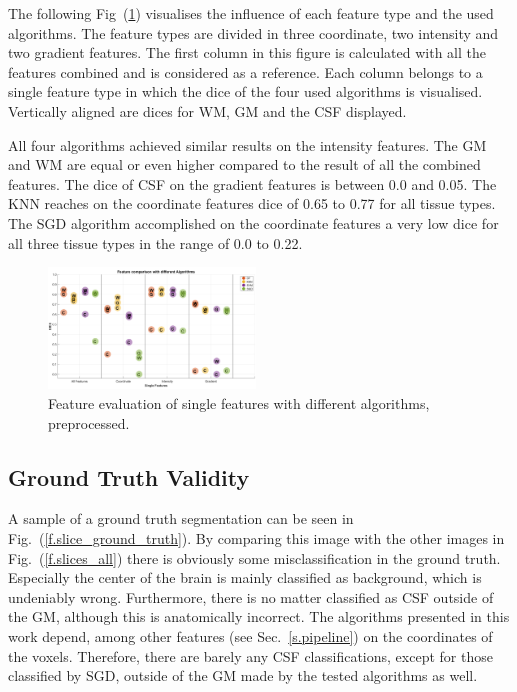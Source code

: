 \documentclass[journal]{IEEEtran}
\begin{document}
The following Fig~(\ref{FeatEval}) visualises the influence of each feature type and the used algorithms. The feature types are divided in three coordinate, two intensity and two gradient features. The first column in this figure is calculated with all the features combined and is considered as a reference. Each column belongs to a single feature type in which the dice of the four used algorithms is visualised. Vertically aligned are dices for WM, GM and the CSF displayed.

All four algorithms achieved similar results on the intensity features. The GM and WM are equal or even higher compared to the result of all the combined features. The dice of CSF on the gradient features is between 0.0 and 0.05. The KNN reaches on the coordinate features dice of 0.65 to 0.77 for all tissue types. The SGD algorithm accomplished on the coordinate features a very low dice for all three tissue types in the range of 0.0 to 0.22.
\begin{figure}[h]
	\centering
	\includegraphics[width=0.49\textwidth]{images/FeatureEvaluation}
	\caption{Feature evaluation of single features with different algorithms, preprocessed.}
	\label{FeatEval}
\end{figure}




\subsection{Ground Truth Validity}

A sample of a ground truth segmentation can be seen in Fig.~(\ref{f.slice_ground_truth}). By comparing this image with the other images in Fig.~(\ref{f.slices_all}) there is obviously some misclassification in the ground truth. Especially the center of the brain is mainly classified as background, which is undeniably wrong. Furthermore, there is no matter classified as CSF outside of the GM, although this is anatomically incorrect. The algorithms presented in this work depend, among other features (see Sec.~\ref{s.pipeline}) on the coordinates of the voxels. Therefore, there are barely any CSF classifications, except for those classified by SGD, outside of the GM made by the tested algorithms as well.
\end{document}
